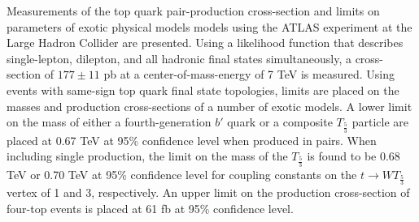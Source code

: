 %

Measurements of the top quark pair-production cross-section and limits on parameters of exotic physical models models using the ATLAS experiment at the Large Hadron Collider are presented.
Using a likelihood function that describes single-lepton, dilepton, and all hadronic final states simultaneously, a cross-section of $177 \pm 11$ pb at a center-of-mass-energy of 7 TeV is measured.
Using events with same-sign top quark final state topologies, limits are placed on the masses and production cross-sections of a number of exotic models.
A lower limit on the mass of either a fourth-generation $b'$ quark or a composite $T_{\frac{5}{3}}$ particle are placed at 0.67 TeV at 95\% confidence level when produced in pairs.
When including single production, the limit on the mass of the $T_{\frac{5}{3}}$ is found to be 0.68 TeV or 0.70 TeV at 95\% confidence level for coupling constants on the $t \rightarrow WT_{\frac{5}{3}}$ vertex of 1 and 3, respectively.
An upper limit on the production cross-section of four-top events is placed at 61 fb at 95\% confidence level.
